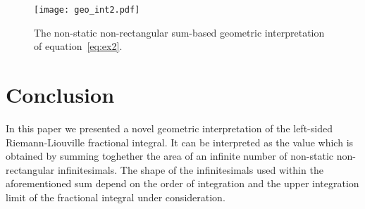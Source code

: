\documentclass[twoside,reqno,11pt]{fcaa-var} %
\begin{document}
\begin{figure}[htb]
\centering
\texttt{[image: geo\_int2.pdf]}
\caption{The non-static non-rectangular sum-based geometric interpretation of equation~\eqref{eq:ex2}.}
\label{fig:geo2}
\end{figure}

\section{Conclusion}
\noindent
In this paper we presented a novel geometric interpretation of the left-sided 
Riemann-Liouville fractional integral. It can be interpreted as the value which is 
obtained by summing toghether the area of an infinite number of non-static non-rectangular infinitesimals. The shape of the infinitesimals used within the aforementioned sum depend on the order of integration and the upper integration limit of the fractional integral under consideration.





\end{document}
